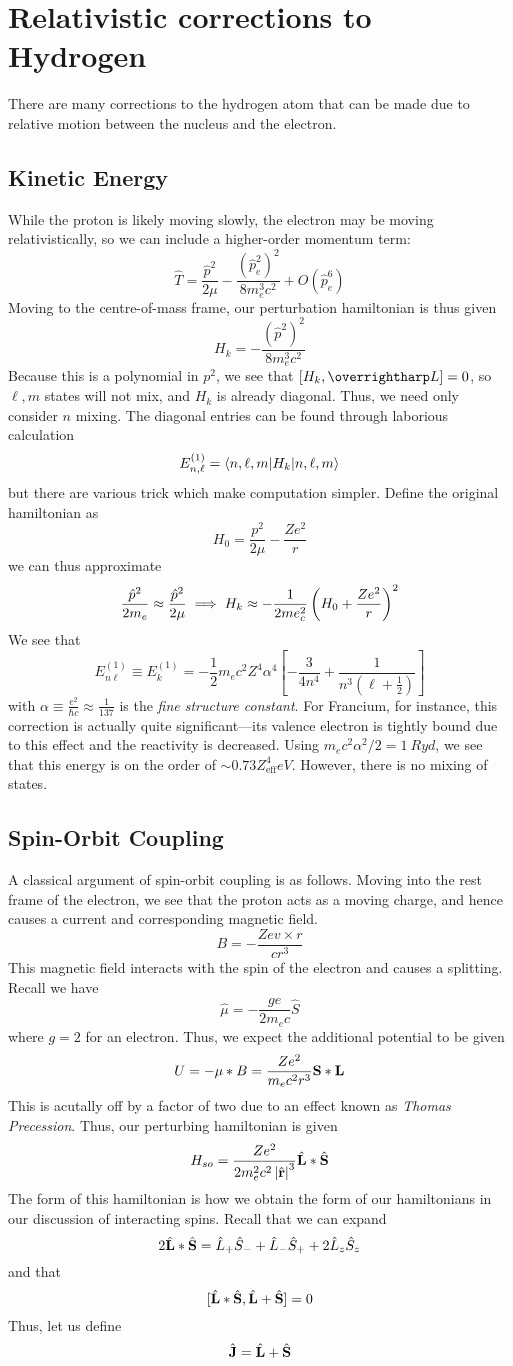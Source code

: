\section{Relativistic corrections to Hydrogen}
There are many corrections to the hydrogen atom that can be made due to relative motion between the nucleus and the electron.
\subsection{Kinetic Energy}
While the proton is likely moving slowly, the electron may be moving relativistically, so we can include a higher-order momentum term:
\[\hat T = \frac{\hat p^2}{2\mu}-\frac{\left(\hat p_e^2\right)^2}{8m_e^3c^2}+O(\hat p_e^6)\]
Moving to the centre-of-mass frame, our perturbation hamiltonian is thus given
\[H_k = -\frac{(\hat p^2)^2}{8m_e^3c^2}\]
Because this is a polynomial in \(p^2\), we see that \([H_k,\vv L] = 0\), so \(\ell,m\) states will not mix, and \(H_k\) is already diagonal. Thus, we need only consider \(n\) mixing. The diagonal entries can be found through laborious calculation
\[E_{n,\ell}^{(1)}=\langle n,\ell,m\rvert H_k\lvert n,\ell,m\rangle\]
but there are various trick which make computation simpler.
Define the original hamiltonian as
\[H_0=\frac{p^2}{2\mu}-\frac{Ze^2}{r}\]
we can thus approximate
\[\frac{\hat p^2}{2m_e}\approx \frac{\hat p^2}{2\mu} \implies H_k\approx -\frac{1}{2me_c^2}\left(H_0+\frac{Ze^2}{r}\right)^2\]
We see that 
\[E_{n\ell}^{(1)} \equiv E_k^{(1)} = -\frac{1}{2}m_ec^2Z^4\alpha^4\left[-\frac{3}{4n^4}+\frac{1}{n^3(\ell+\frac{1}{2})}\right]\]
with \(\alpha\equiv \frac{e^2}{\hbar c}\approx \frac{1}{137}\) is the \emph{fine structure constant}. For Francium, for instance, this correction is actually quite significant---its valence electron is tightly bound due to this effect and the reactivity is decreased. Using \(m_ec^2\alpha^2/2 = \SI{1}{Ryd}\), we see that this energy is on the order of \(\sim0.73Z_{\text{eff}}^4\si{eV}\). However, there is no mixing of states.

\subsection{Spin-Orbit Coupling}
A classical argument of spin-orbit coupling is as follows. Moving into the rest frame of the electron, we see that the proton acts as a moving charge, and hence causes a current and corresponding magnetic field. 
\[B = -\frac{Zev\times r}{cr^3}\]
This magnetic field interacts with the spin of the electron and causes a splitting. Recall we have
\[\hat \mu = -\frac{ge}{2m_ec}\hat S\]
where \(g=2\) for an electron. Thus, we expect the additional potential to be given
\[U = -\mu*B = \frac{Ze^2}{m_ec^2r^3}\mathbf{S}*\mathbf{L}\]
This is acutally off by a factor of two due to an effect known as \emph{Thomas Precession}. Thus, our perturbing hamiltonian is given
\[H_{so} = \frac{Ze^2}{2m_e^2c^2\left|\hat{\mathbf{r}}\right|^3}\hat{\mathbf{L}}*\hat {\mathbf{S}}\]
The form of this hamiltonian is how we obtain the form of our hamiltonians in our discussion of interacting spins. Recall that we can expand 
\[2\hat{\mathbf{L}}*\hat{\mathbf{S}} = \hat L_+\hat S_-+\hat L_-\hat S_+ + 2\hat L_z\hat S_z\]
and that
\[[\hat{\mathbf{L}}*\hat{\mathbf{S}}, \hat{\mathbf{L}}+\hat{\mathbf{S}}] = 0\]
Thus, let us define 
\[\hat{\mathbf{J}} = \hat{\mathbf{L}}+\hat{\mathbf{S}}\]

